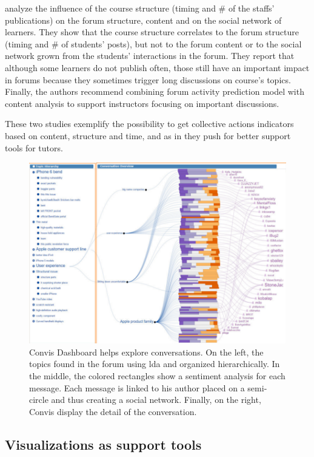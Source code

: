 \documentclass[a4paper,twoside]{article}
\begin{document}
\cite{Boroujeni2017} analyze the influence of the course structure (timing and \# of the staffs' publications) on the forum structure, content and on the social network of learners.  They show that the course structure correlates to the forum structure (timing  and \# of students' posts), but not to the forum content or to the social network grown from the students' interactions in the forum.  They report that although some learners do not publish often, those still have an important impact in forums because they sometimes trigger long discussions on course's topics.  Finally, the authors recommend combining forum activity prediction model with content analysis to support instructors focusing on important discussions.

These two studies exemplify the possibility to get collective actions indicators based on content, structure and time, and as in \citep{Ezen2015} they push for better support tools for tutors.

\begin{figure}[t]
 \includegraphics[width=.5\textwidth]{images/convis.png}
 \small{
  \caption{\label{fig:convis}
   Convis Dashboard \citep{Hoque2016} helps explore conversations.  On the left, the topics found in the forum using \gls{lda} and organized hierarchically.  In the middle, the colored rectangles show a sentiment analysis for each message.  Each message is linked to his author placed on a semi-circle and thus creating a social network.  Finally, on the right, Convis display the detail of the conversation.  }}
\end{figure}

\subsection{Visualizations as support tools}
\end{document}
